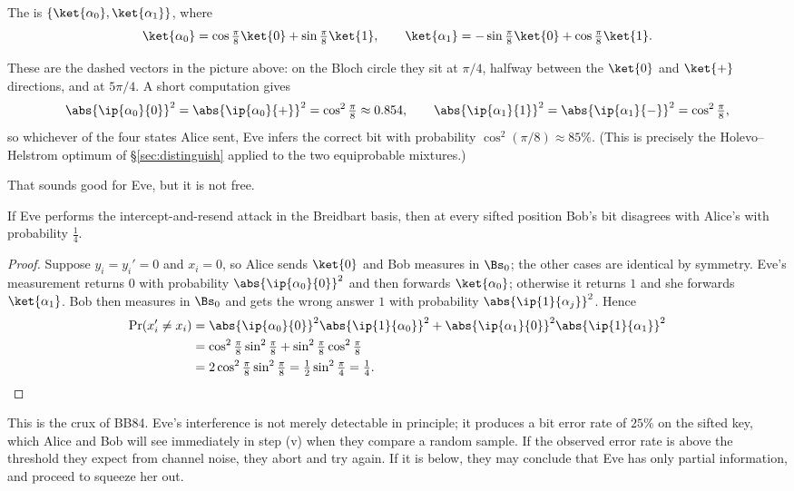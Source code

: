 \begin{definition}
	The  is $\{\ket{\alpha_0},\ket{\alpha_1}\}$, where
	$$\ket{\alpha_0} = \cos\tfrac{\pi}{8}\ket{0} + \sin\tfrac\pi8\ket{1}, \qquad \ket{\alpha_1} = -\sin\tfrac\pi8\ket{0}+\cos\tfrac\pi8\ket{1}.$$
\end{definition}

These are the dashed vectors in the picture above: on the Bloch circle they sit at $\pi/4$, halfway between the $\ket{0}$ and $\ket{+}$ directions, and at $5\pi/4$. A short computation gives
$$\abs{\ip{\alpha_0}{0}}^2 = \abs{\ip{\alpha_0}{+}}^2 = \cos^2\tfrac\pi8 \approx 0.854, \qquad \abs{\ip{\alpha_1}{1}}^2 = \abs{\ip{\alpha_1}{-}}^2 = \cos^2\tfrac\pi8,$$
so whichever of the four states Alice sent, Eve infers the correct bit with probability $\cos^2(\pi/8) \approx 85\%$. (This is precisely the Holevo--Helstrom optimum of \S\ref{sec:distinguish} applied to the two equiprobable mixtures.)

That sounds good for Eve, but it is not free.

\begin{proposition}
	If Eve performs the intercept-and-resend attack in the Breidbart basis, then at every sifted position Bob's bit disagrees with Alice's with probability $\tfrac14$.
\end{proposition}

\begin{proof}
	Suppose $y_i = y_i' = 0$ and $x_i = 0$, so Alice sends $\ket{0}$ and Bob measures in $\Bs_0$; the other cases are identical by symmetry. Eve's measurement returns $0$ with probability $\abs{\ip{\alpha_0}{0}}^2$ and then forwards $\ket{\alpha_0}$; otherwise it returns $1$ and she forwards $\ket{\alpha_1}$. Bob then measures in $\Bs_0$ and gets the wrong answer $1$ with probability $\abs{\ip{1}{\alpha_j}}^2$. Hence
	\begin{align*}
		\Pr(x_i'\neq x_i) &= \abs{\ip{\alpha_0}{0}}^2\abs{\ip{1}{\alpha_0}}^2 + \abs{\ip{\alpha_1}{0}}^2\abs{\ip{1}{\alpha_1}}^2 \\
		&= \cos^2\tfrac\pi8\sin^2\tfrac\pi8 + \sin^2\tfrac\pi8\cos^2\tfrac\pi8 \\
		&= 2\cos^2\tfrac\pi8\sin^2\tfrac\pi8 = \tfrac12\sin^2\tfrac\pi4 = \tfrac14. \qedhere
	\end{align*}
\end{proof}

This is the crux of BB84. Eve's interference is not merely detectable in principle; it produces a bit error rate of $25\%$ on the sifted key, which Alice and Bob will see immediately in step (v) when they compare a random sample. If the observed error rate is above the threshold they expect from channel noise, they abort and try again. If it is below, they may conclude that Eve has only partial information, and proceed to squeeze her out.


